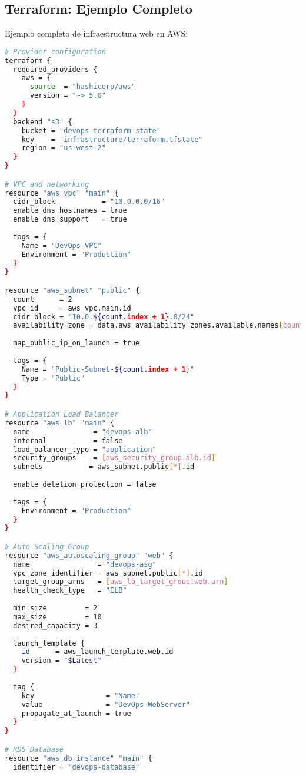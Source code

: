 \documentclass[12pt,a4paper]{article}
\begin{document}
\subsection{Terraform: Ejemplo Completo}
Ejemplo completo de infraestructura web en AWS:
\begin{lstlisting}[language=bash, caption=Terraform - Infraestructura AWS completa]
# Provider configuration
terraform {
  required_providers {
    aws = {
      source  = "hashicorp/aws"
      version = "~> 5.0"
    }
  }
  backend "s3" {
    bucket = "devops-terraform-state"
    key    = "infrastructure/terraform.tfstate"
    region = "us-west-2"
  }
}

# VPC and networking
resource "aws_vpc" "main" {
  cidr_block           = "10.0.0.0/16"
  enable_dns_hostnames = true
  enable_dns_support   = true
  
  tags = {
    Name = "DevOps-VPC"
    Environment = "Production"
  }
}

resource "aws_subnet" "public" {
  count      = 2
  vpc_id     = aws_vpc.main.id
  cidr_block = "10.0.${count.index + 1}.0/24"
  availability_zone = data.aws_availability_zones.available.names[count.index]
  
  map_public_ip_on_launch = true
  
  tags = {
    Name = "Public-Subnet-${count.index + 1}"
    Type = "Public"
  }
}

# Application Load Balancer
resource "aws_lb" "main" {
  name               = "devops-alb"
  internal           = false
  load_balancer_type = "application"
  security_groups    = [aws_security_group.alb.id]
  subnets           = aws_subnet.public[*].id
  
  enable_deletion_protection = false
  
  tags = {
    Environment = "Production"
  }
}

# Auto Scaling Group
resource "aws_autoscaling_group" "web" {
  name                = "devops-asg"
  vpc_zone_identifier = aws_subnet.public[*].id
  target_group_arns   = [aws_lb_target_group.web.arn]
  health_check_type   = "ELB"
  
  min_size         = 2
  max_size         = 10
  desired_capacity = 3
  
  launch_template {
    id      = aws_launch_template.web.id
    version = "$Latest"
  }
  
  tag {
    key                 = "Name"
    value               = "DevOps-WebServer"
    propagate_at_launch = true
  }
}

# RDS Database
resource "aws_db_instance" "main" {
  identifier = "devops-database"
  

\end{lstlisting}
\end{document}
